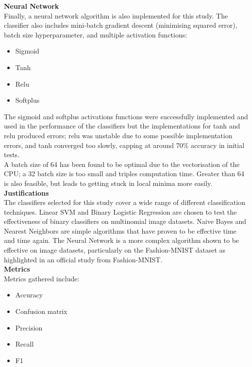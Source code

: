 \documentclass[11pt,a4paper]{article}
\begin{document}
\noindent
\textbf{Neural Network}\\

\noindent Finally, a neural network algorithm is also implemented for this study. The classifier also includes mini-batch gradient descent (minimising squared error), batch size hyperparameter, and multiple activation functions:
\begin{itemize}
    \item Sigmoid
    \item Tanh
    \item Relu
    \item Softplus\\
\end{itemize}

\noindent The sigmoid and softplus activations functions were successfully implemented and used in the performance of the classifiers but the implementations for tanh and relu produced errors; relu was unstable due to some possible implementation errors, and tanh converged too slowly, capping at around 70\% accuracy in initial tests.\\

\noindent A batch size of 64 has been found to be optimal due to the vectorisation of the CPU; a 32 batch size is too small and triples computation time. Greater than 64 is also feasible, but leads to getting stuck in local minima more easily.\\

\noindent
\textbf{Justifications}\\

\noindent The classifiers selected for this study cover a wide range of different classification techniques. Linear SVM and Binary Logistic Regression are chosen to test the effectiveness of binary classifiers on multinomial image datasets. Naive Bayes and Nearest Neighbors are simple algorithms that have proven to be effective time and time again. The Neural Network is a more complex algorithm shown to be effective on image datasets, particularly on the Fashion-MNIST dataset as highlighted in an official study from Fashion-MNIST.\\

\noindent
\textbf{Metrics}\\

\noindent
Metrics gathered include:
\begin{itemize}
    \item Accuracy
    \item Confusion matrix
    \item Precision
    \item Recall
    \item F1
\end{itemize}
\end{document}
